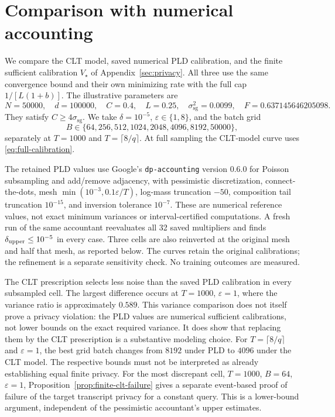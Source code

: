 \documentclass[11pt]{article}
\newcommand{\sg}{\mathrm{sg}}
\begin{document}
\section{Comparison with numerical accounting}
\label{sec:clt-numerical}
We compare the CLT model, saved numerical PLD calibration, and the finite
sufficient calibration $V_\star$ of Appendix~\ref{sec:privacy}. All three
use the same convergence bound and their own minimizing rate with the
full cap $1/[L(1+b)]$. The illustrative parameters are
\[
 N=50000,\quad d=100000,\quad C=0.4,\quad L=0.25,\quad
 \sigma_{\sg}^2=0.0099,\quad F=0.637145646205098.
\]
They satisfy $C\ge4\sigma_{\sg}$. We take $\delta=10^{-5}$,
$\varepsilon\in\{1,8\}$, and the batch grid
\[
 B\in\{64,256,512,1024,2048,4096,8192,50000\},
\]
separately at $T=1000$ and $T=\lceil8/q\rceil$.
At full sampling the CLT-model curve uses
\eqref{eq:full-calibration}.

The retained PLD values use Google's \texttt{dp-accounting} version 0.6.0
for Poisson subsampling and add/remove adjacency, with pessimistic
discretization, connect-the-dots, mesh
$\min(10^{-3},0.1\varepsilon/T)$, log-mass truncation $-50$, composition
tail truncation $10^{-15}$, and inversion tolerance $10^{-7}$.
These are numerical reference values, not exact minimum variances or
interval-certified computations. A fresh run of the same accountant reevaluates
all 32 saved multipliers and finds $\delta_{\rm upper}\le10^{-5}$ in every
case. Three cells are also reinverted at the original mesh and half that mesh,
as reported below. The curves retain the original calibrations; the refinement
is a separate sensitivity check. No training outcomes are measured.

\begin{table}[ht]
\centering\small

\caption{Variance ratios over the subsampled grid and batch sizes minimizing
the displayed bound on the eight-point grid. ``Finite'' means $V_\star$.
Each method uses its own capped optimal learning rate.}
\label{tab:clt-comparison}
\end{table}

The CLT prescription selects less noise than the saved PLD calibration in
every subsampled cell. The largest difference occurs at $T=1000$,
$\varepsilon=1$, where the variance ratio is approximately $0.589$.
This variance comparison does not itself prove a privacy violation: the PLD values
are numerical sufficient calibrations, not lower bounds on the exact
required variance. It does show that replacing them by the CLT prescription
is a substantive modeling choice. For $T=\lceil8/q\rceil$ and
$\varepsilon=1$, the best grid batch changes from $8192$ under PLD to
$4096$ under the CLT model. The respective bounds must not be interpreted
as already establishing equal finite privacy. For the most discrepant cell,
$T=1000$, $B=64$, $\varepsilon=1$, Proposition~\ref{prop:finite-clt-failure}
gives a separate event-based proof of failure of the target transcript privacy
for a constant query. This is a lower-bound argument, independent of the
pessimistic accountant's upper estimates.
\end{document}
